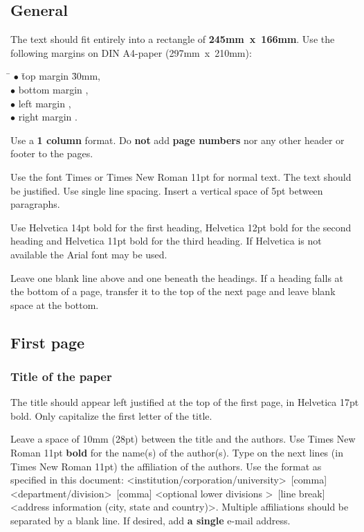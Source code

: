 \documentclass{ISMA_USD2020}
\begin{document}
\subsection{General}

The text should fit entirely into a rectangle of \mbox{\textbf{245mm x 166mm}}. Use the following margins on DIN A4-paper \mbox{(297mm x 210mm)}:
\begin{tabbing}
\hspace{4mm} \= $\bullet$ \hspace{1mm} \= top margin \hspace{10mm} \= 30mm,\\
\> $\bullet$ \> bottom margin \> 22mm,\\
\> $\bullet$ \> left margin  \> 22mm,\\
\> $\bullet$ \> right margin \> 22mm.
\end{tabbing}
Use a \textbf{1 column} format. Do \textbf{not} add \textbf{page numbers} nor any other header or footer to the pages.

Use the font Times or Times New Roman 11pt for normal text. The text should be justified. Use single line spacing. Insert a vertical space of 5pt between paragraphs.

Use Helvetica 14pt bold for the first heading, Helvetica 12pt bold for the second heading and Helvetica 11pt bold for the third heading. If Helvetica is not available the Arial font may be used.

Leave one blank line above and one beneath the headings. If a heading falls at the bottom of a page, transfer it to the top of the next page and leave blank space at the bottom.

\subsection{First page}

\subsubsection{Title of the paper}

The title should appear left justified at the top of the first page, in Helvetica 17pt bold. Only capitalize the first letter of the title.

Leave a space of 10mm (28pt) between the title and the authors. Use Times New Roman 11pt \textbf{bold} for the name(s) of the author(s). Type on the next lines (in Times New Roman 11pt) the affiliation of the authors. Use the format as specified in this document: \textless institution/corporation/university\textgreater ~[comma] \textless department/division\textgreater ~[comma] \textless optional lower divisions \textgreater ~[line break] \textless address information (city, state and country)\textgreater. Multiple affiliations should be separated by a blank line. If desired, add \textbf{a single} e-mail address. 
\end{document}

